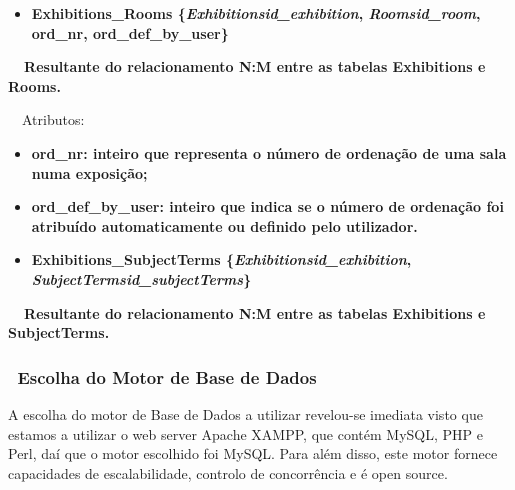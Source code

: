 \documentclass[letterpaper]{article}
\newcommand\liststyleLxviii{%
\renewcommand\labelitemi{{\textbullet}}
\renewcommand\labelitemii{{\textbullet}}
\renewcommand\labelitemiii{{\textbullet}}
\renewcommand\labelitemiv{{\textbullet}}
}
\newcommand\liststyleLxx{%
\renewcommand\labelitemi{[27A2?]}
\renewcommand\labelitemii{[27A2?]}
\renewcommand\labelitemiii{[27A2?]}
\renewcommand\labelitemiv{[27A2?]}
}
\begin{document}
\bigskip

\liststyleLxviii
\begin{itemize}
\item {\bfseries
Exhibitions\_Rooms
\textmd{\{}\textmd{\textit{Exhibitionsid\_exhibition}}\textmd{,
}\textmd{\textit{Roomsid\_room}}\textmd{, ord\_nr,
ord\_def\_by\_user\}}}
\end{itemize}
{\bfseries
\textmd{\ \ Resultante do relacionamento N:M entre as tabelas
Exhibitions e Rooms.}\ \ }


\bigskip

{
\ \ Atributos:}

\liststyleLxx
\begin{itemize}
\item {\bfseries
ord\_nr:\textmd{ inteiro que representa o n\'umero de ordena\c{c}\~ao de
uma sala numa exposi\c{c}\~ao;}}
\item {\bfseries
ord\_def\_by\_user:\textmd{ inteiro que indica se o n\'umero de
ordena\c{c}\~ao foi atribu\'ido automaticamente ou definido pelo
utilizador.}}
\end{itemize}

\bigskip

\liststyleLxviii
\begin{itemize}
\item {\bfseries
Exhibitions\_SubjectTerms\textmd{
\{}\textmd{\textit{Exhibitionsid\_exhibition}}\textmd{,
}\textmd{\textit{SubjectTermsid\_subjectTerms}}\textmd{\}}}
\end{itemize}
{\bfseries
\textmd{\ \ Resultante do relacionamento N:M entre as tabelas
Exhibitions e SubjectTerms.}\ \ }


\bigskip


\bigskip


\bigskip

\subsubsection[\ Escolha do Motor de Base de
Dados]{ \ Escolha do Motor de Base de Dados}
{
A escolha do motor de Base de Dados a utilizar revelou-se imediata visto
que estamos a utilizar o web server Apache XAMPP, que cont\'em MySQL,
PHP e Perl, da\'i que o motor escolhido foi MySQL. Para al\'em disso,
este motor fornece capacidades de escalabilidade, controlo de
concorr\^encia e \'e open source.}
\end{document}
